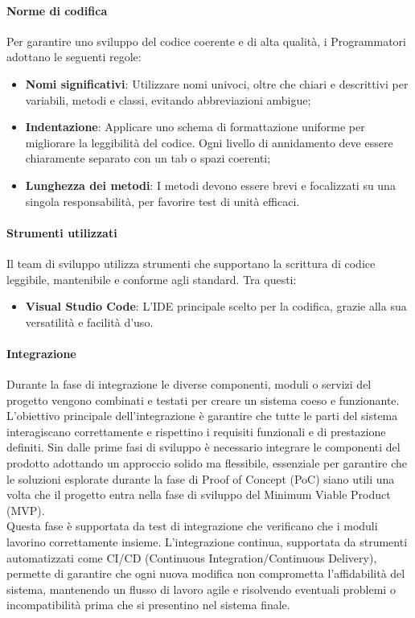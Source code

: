 \documentclass[10pt]{article}
\begin{document}
\begin{justify}
        \paragraph{Norme di codifica}
        Per garantire uno sviluppo del codice coerente e di alta qualità, i Programmatori adottano le seguenti regole:
        \begin{itemize}
            \item \textbf{Nomi significativi}: Utilizzare nomi univoci, oltre che chiari e descrittivi per variabili, metodi e classi, evitando abbreviazioni ambigue;
            \item \textbf{Indentazione}: Applicare uno schema di formattazione uniforme per migliorare la leggibilità del codice. Ogni livello di annidamento deve essere chiaramente separato con un tab o spazi coerenti;
            \item \textbf{Lunghezza dei metodi}: I metodi devono essere brevi e focalizzati su una singola responsabilità, per favorire test di unità efficaci.
        \end{itemize}

        \paragraph{Strumenti utilizzati}
        Il team di sviluppo utilizza strumenti che supportano la scrittura di codice leggibile, mantenibile e conforme agli standard. Tra questi:
        \begin{itemize}
            \item \textbf{Visual Studio Code}: L'IDE principale scelto per la codifica, grazie alla sua versatilità e facilità d'uso.
        \end{itemize}

        \paragraph{Integrazione}
        Durante la fase di integrazione le diverse componenti, moduli o servizi del progetto vengono combinati e testati per creare un sistema coeso e funzionante.\\
        L'obiettivo principale dell'integrazione è garantire che tutte le parti del sistema interagiscano correttamente e rispettino i requisiti funzionali e di prestazione definiti.
        Sin dalle prime fasi di sviluppo è necessario integrare le componenti del prodotto adottando un approccio solido ma flessibile, essenziale per garantire che le soluzioni esplorate durante la fase di Proof of Concept (PoC) siano utili una volta che il progetto entra nella fase di sviluppo del Minimum Viable Product (MVP).\\
        Questa fase è supportata da test di integrazione che verificano che i moduli lavorino correttamente insieme. L'integrazione continua, supportata da strumenti automatizzati come CI/CD (Continuous Integration/Continuous Delivery), permette di garantire che ogni nuova modifica non comprometta l'affidabilità del sistema, mantenendo un flusso di lavoro agile e risolvendo eventuali problemi o incompatibilità prima che si presentino nel sistema finale.\\


\end{justify}
\end{document}
